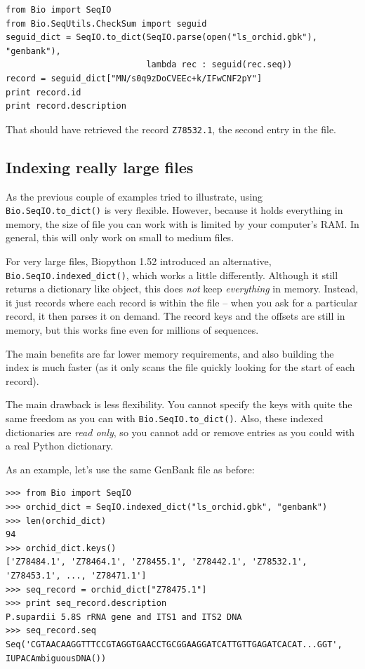 \documentclass{report}
\begin{document}
\begin{verbatim}
from Bio import SeqIO
from Bio.SeqUtils.CheckSum import seguid
seguid_dict = SeqIO.to_dict(SeqIO.parse(open("ls_orchid.gbk"), "genbank"),
                            lambda rec : seguid(rec.seq))
record = seguid_dict["MN/s0q9zDoCVEEc+k/IFwCNF2pY"]
print record.id
print record.description
\end{verbatim}

\noindent That should have retrieved the record {\tt Z78532.1}, the second entry in the file.

\subsection{Indexing really large files}
\label{sec:seqio-indexed-dict}

As the previous couple of examples tried to illustrate, using
\verb|Bio.SeqIO.to_dict()| is very flexible. However, because it holds
everything in memory, the size of file you can work with is limited by your
computer's RAM. In general, this will only work on small to medium files.

For very large files, Biopython 1.52 introduced an alternative,
\verb|Bio.SeqIO.indexed_dict()|, which works a little differently. Although
it still returns a dictionary like object, this does \emph{not} keep
\emph{everything} in memory. Instead, it just records where each record
is within the file -- when you ask for a particular record, it then parses
it on demand. The record keys and the offsets are still in memory, but this
works fine even for millions of sequences.

The main benefits are far lower memory requirements, and also building
the index is much faster (as it only scans the file quickly looking for
the start of each record).

The main drawback is less flexibility. You cannot specify the keys with quite
the same freedom as you can with \verb|Bio.SeqIO.to_dict()|. Also, these
indexed dictionaries are \emph{read only}, so you cannot add or remove
entries as you could with a real Python dictionary.

As an example, let's use the same GenBank file as before:

\begin{verbatim}
>>> from Bio import SeqIO
>>> orchid_dict = SeqIO.indexed_dict("ls_orchid.gbk", "genbank")
>>> len(orchid_dict)
94
>>> orchid_dict.keys()
['Z78484.1', 'Z78464.1', 'Z78455.1', 'Z78442.1', 'Z78532.1', 'Z78453.1', ..., 'Z78471.1']
>>> seq_record = orchid_dict["Z78475.1"]
>>> print seq_record.description
P.supardii 5.8S rRNA gene and ITS1 and ITS2 DNA
>>> seq_record.seq
Seq('CGTAACAAGGTTTCCGTAGGTGAACCTGCGGAAGGATCATTGTTGAGATCACAT...GGT', IUPACAmbiguousDNA())
\end{verbatim}
\end{document}
